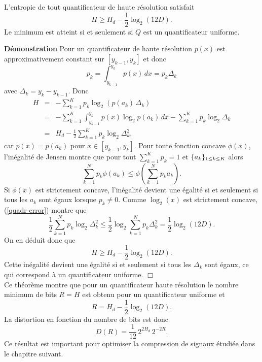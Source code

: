 \begin{theorem}
\label{quanti-theo}
L'entropie de 
tout quantificateur de haute r\'esolution satisfait
\begin{equation}
\label{lower-quantX}
H \geq H_d - \frac 1 2 \log_2 (12 D) .
\end{equation}
Le minimum est atteint si et seulement si $Q$ est un 
quantificateur uniforme.
\end{theorem}

{\bf D\'emonstration} Pour un quantificateur de haute r\'esolution
$p(x)$ est approximativement constant sur $[y_{k-1},y_k]$
et donc 
\[
p_k = \int_{y_{k-1}}^{y_k} p(x)\,dx = p_k \Delta_k
\]
avec $\Delta_k = y_k - y_{k-1}$. 
Donc
\begin{eqnarray*}
H & = & - \sum_{k=1}^K p_k \log_2 (p(a_k)\, \Delta_k )\\
& = &- \sum_{k=1}^K \int_{y_{k-1}}^{y_k} p(x) \log_2 p(a_k)\, dx  
- \sum_{k=1}^K p_k \log_2 \Delta_k \\
& = & H_d - \frac 1 2 \sum_{k=1}^K p_k \log_2 \Delta_k^2 ,
\end{eqnarray*}
car $p(x) = p(a_k)$ pour $x \in [y_{k-1},y_k]$.
Pour toute fonction concave $\phi (x)$, l'in\'egalit\'e de Jensen
montre que pour tout $\sum_{k=1}^K p_k = 1$ 
et $\{a_k \}_{ 1 \leq k \leq K}$ alors
\begin{equation}
\label{jensen}
\sum_{k=1}^N p_k \phi ( a_k) \leq \phi(\sum_{k=1}^N  p_k a_k) .
\end{equation}
Si $\phi (x)$ est strictement concave, l'in\'egalit\'e devient une \'egalit\'e
si et seulement si tous les $a_k$ sont \'egaux lorsque
$p_k \neq 0$. Comme $\log_2(x)$ est strictement concave,
(\ref{quadr-error}) montre que
\[
 \frac 1 2 \sum_{k=1}^N p_k \log_2 \Delta_k^2 \leq 
 \frac 1 2 \log_2 \sum_{k=1}^N p_k \Delta_k^2 = 
 \frac 1 2 \log_2 (12 D ) .
\]
On en d\'eduit donc que
\[
H \geq H_d - \frac 1 2 \log_2 (12 D ).
\]
Cette in\'egalit\'e devient une \'egalit\'e si et seulement si tous les
$\Delta_k$ sont \'egaux, ce qui correspond \`a un quantificateur 
uniforme.
$\Box$\\

Ce th\'eor\`eme montre que pour un quantificateur haute r\'esolution
le nombre minimum de bits
$R = H$ est obtenu pour un quantificateur uniforme et
\begin{equation}
\label{bit-rate-uniform}
R = H_d -  \frac 1 2 \log_2 (12 D ).
\end{equation}
La distortion en fonction du nombre de bits est donc
\[
D(R) = \frac 1 {12}\, 2^{2 H_d} \,2^{-2R} .
\]
Ce r\'esultat est important pour optimiser la compression
de signaux \'etudi\'ee dans le chapitre suivant.
